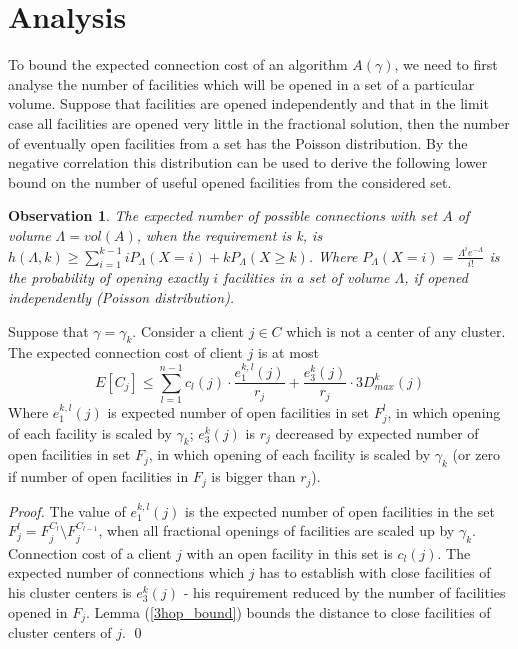 \documentclass{llncs}
\newtheorem{observation}{\textbf{Observation}}
\begin{document}
\section{Analysis}

To bound the expected connection cost of an algorithm $A(\gamma)$, we need to first analyse the number of facilities which will be opened in a set of a particular volume. Suppose that facilities are opened independently and that in the limit case all facilities are opened very little in the fractional solution, then the number of eventually open facilities from a set has the Poisson distribution. By the negative correlation this distribution can be used to derive the following lower bound on the number of useful opened facilities from the considered set.

\begin{observation} 
The expected number of possible connections with set $A$ of volume $\varLambda = vol(A)$, when the requirement is k, is $h(\varLambda, k) \geq \sum_{i = 1}^{k-1}i P_{\varLambda}(X = i) + k P_{\varLambda}(X \geq k)$. Where $P_{\varLambda}(X = i) = \frac{\varLambda^i e^{-\varLambda}}{i!}$ is the probability of opening exactly $i$ facilities in a set of volume $\varLambda$, if opened independently (Poisson distribution).
\end{observation}

\begin{lemma}
\label{alg_A_connection_cost}
Suppose that $\gamma=\gamma_k$. Consider a client $j \in C$ which is not a center of any cluster. The expected connection cost of client $j$ is at most
$$E[C_j] \leq \sum_{l = 1}^{n-1} c_l(j) \cdot \frac{e^{k,l}_{1}(j)}{r_j} + \frac{e^{k}_{3}(j)}{r_j} \cdot 3 D_{max}^k(j)$$
Where $e_1^{k, l}(j)$ is expected number of open facilities in set $F_j^l$, in which opening of each facility is scaled by $\gamma_k$; $e_3^{k}(j)$ is $r_j$ decreased by expected number of open facilities in set $F_j$, in which opening of each facility is scaled by $\gamma_k$ (or zero if number of open facilities in $F_j$ is bigger than $r_j$).
\end{lemma}

\begin{proof}
 The value of $e_1^{k, l}(j)$ is the expected number of open facilities in the set $F_j^l = F_j^{C_l} \setminus F_j^{C_{l-1}}$, when all fractional openings of facilities are scaled up by $\gamma_k$. Connection cost of a client $j$ with an open facility in this set is $c_l(j)$. The expected number of connections which $j$ has to establish with close facilities of his cluster centers is $e_3^{k}(j)$ - his requirement reduced by the number of facilities opened in $F_j$. Lemma (\ref{3hop_bound}) bounds the distance to close facilities of cluster centers of $j$.
 \qed
\end{proof}
\end{document}
